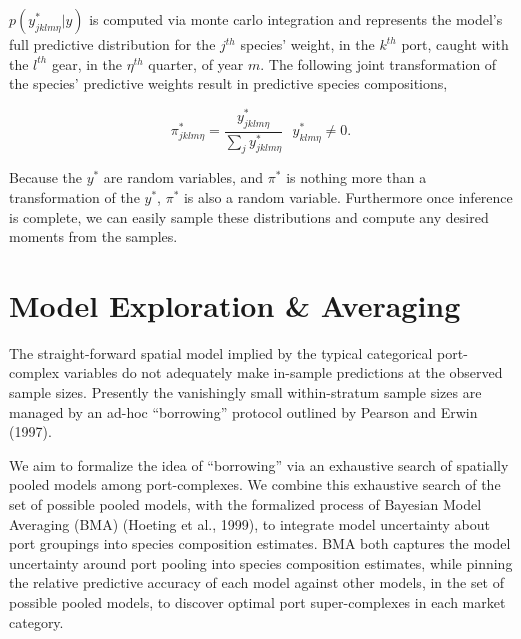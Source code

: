 \(p(y^*_{jklm\eta}|y)\) is computed via monte carlo integration and
represents the model's full predictive distribution for the \(j^{th}\)
species' weight, in the \(k^{th}\) port, caught with the \(l^{th}\)
gear, in the \(\eta^{th}\) quarter, of year \(m\). The following joint
transformation of the species' predictive weights result in predictive
species compositions,

\[\pi^*_{jklm\eta} = \frac{y^*_{jklm\eta}}{\sum_j y^*_{jklm\eta}} ~~~ y^*_{klm\eta}\neq 0.\]

Because the \(y^*\) are random variables, and \(\pi^*\) is nothing more
than a transformation of the \(y^*\), \(\pi^*\) is also a random
variable. Furthermore once inference is complete, we can easily sample
these distributions and compute any desired moments from the samples.

\section{Model Exploration \&
Averaging}\label{model-exploration-averaging}

The straight-forward spatial model implied by the typical categorical
port-complex variables do not adequately make in-sample predictions at
the observed sample sizes. Presently the vanishingly small
within-stratum sample sizes are managed by an ad-hoc ``borrowing''
protocol outlined by Pearson and Erwin (1997).

We aim to formalize the idea of ``borrowing'' via an exhaustive search
of spatially pooled models among port-complexes. We combine this
exhaustive search of the set of possible pooled models, with the
formalized process of Bayesian Model Averaging (BMA) (Hoeting et al.,
1999), to integrate model uncertainty about port groupings into species
composition estimates. BMA both captures the model uncertainty around
port pooling into species composition estimates, while pinning the
relative predictive accuracy of each model against other models, in the
set of possible pooled models, to discover optimal port super-complexes
in each market category.

